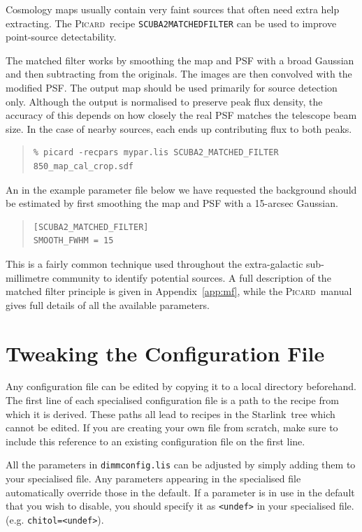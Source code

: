 \documentclass[twoside,11pt]{article}
\newcommand{\htmladdnormallink}[2]{#1}
\newcommand{\xref}[3]{#1}
\newcommand{\xlabel}[1]{}
\renewcommand{\_}{\texttt{\symbol{95}}}
\newenvironment{myquote}{\begin{quote}\begin{small}}{\end{small}\end{quote}}
\newcommand{\starlink}{\htmladdnormallink{Starlink}{http://starlink.jach.hawaii.edu}}
\newcommand{\picard}{\xref{\textsc{Picard}}{sun265}{}}
\begin{document}
Cosmology maps usually contain very faint sources that often need
extra help extracting. The \picard\ recipe
\texttt{SCUBA2\_MATCHED\_FILTER} can be used to improve point-source
detectability.

The matched filter works by smoothing the map and PSF with a broad
Gaussian and then subtracting from the originals. The images are then
convolved with the modified PSF.  The output map should be used
primarily for source detection only. Although the output is normalised
to preserve peak flux density, the accuracy of this depends on how
closely the real PSF matches the telescope beam size. In the case of
nearby sources, each ends up contributing flux to both peaks.

 \begin{myquote}
\begin{verbatim}
% picard -recpars mypar.lis SCUBA2_MATCHED_FILTER 850_map_cal_crop.sdf
\end{verbatim}
\end{myquote}

An in the example parameter file below we have requested the
background should be estimated by first smoothing the map and PSF with
a 15-arcsec Gaussian.
\begin{myquote}
\begin{verbatim}
[SCUBA2_MATCHED_FILTER]
SMOOTH_FWHM = 15
\end{verbatim}
\end{myquote}
This is a fairly common technique used throughout the extra-galactic
sub-millimetre community to identify potential sources. A full
description of the matched filter principle is given in
Appendix~\ref{app:mf}, while the \picard\ manual gives full details of
all the available parameters.

\clearpage
\section{\xlabel{tweak}Tweaking the Configuration File}
\label{sec:tweak}

Any configuration file can be edited by copying it to a local
directory beforehand. The first line of each specialised configuration
file is a path to the recipe from which it is derived. These paths all
lead to recipes in the \starlink\ tree which cannot be edited. If you
are creating your own file from scratch, make sure to include this
reference to an existing configuration file on the first line.

All the parameters in \texttt{dimmconfig.lis} can be adjusted by
simply adding them to your specialised file. Any parameters appearing
in the specialised file automatically override those in the default.
If a parameter is in use in the default that you wish to disable, you
should specify it as \texttt{<undef>} in your specialised file. (e.g.
\texttt{chitol=<undef>}).
\end{document}
